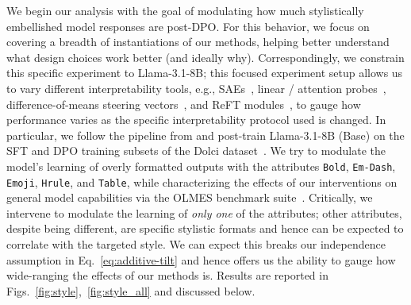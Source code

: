 \documentclass{article} %
\begin{document}
We begin our analysis with the goal of modulating how much stylistically embellished model responses are post-DPO.
% 
For this behavior, we focus on covering a breadth of instantiations of our methods, helping better understand what design choices work better (and ideally why).
% 
Correspondingly, we constrain this specific experiment to Llama-3.1-8B; this focused experiment setup allows us to vary different interpretability tools, e.g., SAEs~\citep{bussmann2024batchtopk}, linear / attention probes~\citep{belinkov2022probing, mckenzie2025detecting}, difference-of-means steering vectors~\citep{turner2024steeringlanguagemodelsactivation}, and ReFT modules~\citep{wu2024reft}, to gauge how performance varies as the specific interpretability protocol used is changed.
% 
In particular, we follow the pipeline from \cite{olmo2025olmo} and post-train Llama-3.1-8B (Base) on the SFT and DPO training subsets of the Dolci dataset~\citep{dolci}.
% 
We try to modulate the model's learning of overly formatted outputs with the attributes \texttt{Bold}, \texttt{Em-Dash}, \texttt{Emoji}, \texttt{Hrule}, and \texttt{Table}, while characterizing the effects of our interventions on general model capabilities via the OLMES benchmark suite~\citep{olmes}.
% 
Critically, we intervene to modulate the learning of \textit{only one} of the attributes; other attributes, despite being different, are specific stylistic formats and hence can be expected to correlate with the targeted style.
% 
We can expect this breaks our independence assumption in Eq.~\ref{eq:additive-tilt} and hence offers us the ability to gauge how wide-ranging the effects of our methods is.
% 
Results are reported in Figs.~\ref{fig:style},~\ref{fig:style_all} and discussed below.
\end{document}
